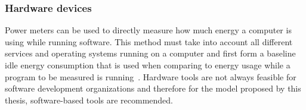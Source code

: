 \subsubsection{Hardware devices}
Power meters can be used to directly measure how much energy a computer is using while running software. This method must take into account all different services and operating systems running on a computer and first form a baseline idle energy consumption that is used when comparing to energy usage while a program to be measured is running~\cite{studyoninfluence}. Hardware tools are not always feasible for software development organizations and therefore for the model proposed by this thesis, software-based tools are recommended.